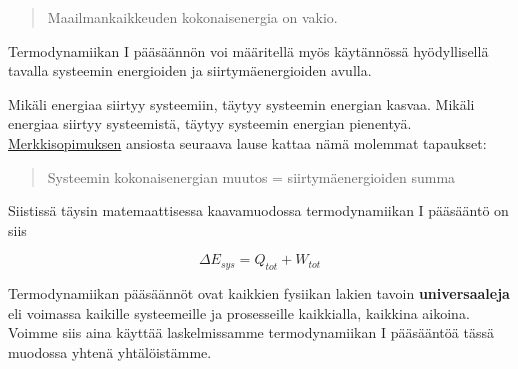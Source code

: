 \documentclass[12pt,a4paper,finnish]{book}
\begin{document}
\begin{quote}
 Maailmankaikkeuden kokonaisenergia on vakio.
\end{quote}

Termodynamiikan I pääsäännön voi määritellä myös käytännössä hyödyllisellä tavalla 
systeemin energioiden ja siirtymäenergioiden avulla. 

Mikäli energiaa siirtyy systeemiin, 
täytyy systeemin energian kasvaa. Mikäli energiaa siirtyy systeemistä, täytyy systeemin 
energian pienentyä. \hyperref[sec:merkkisopimus]{Merkkisopimuksen} ansiosta seuraava 
lause kattaa nämä molemmat tapaukset:

\begin{quote}
 Systeemin kokonaisenergian muutos = siirtymäenergioiden summa
\end{quote}

Siistissä täysin matemaattisessa kaavamuodossa termodynamiikan I pääsääntö on siis

\begin{equation}
 \Delta E_{sys} = Q_{tot} + W_{tot}
\end{equation}

Termodynamiikan pääsäännöt ovat kaikkien fysiikan lakien tavoin \textbf{universaaleja} 
eli voimassa kaikille systeemeille ja prosesseille kaikkialla, kaikkina aikoina. Voimme 
siis aina käyttää laskelmissamme termodynamiikan I pääsääntöä tässä muodossa yhtenä 
yhtälöistämme.
\end{document}
